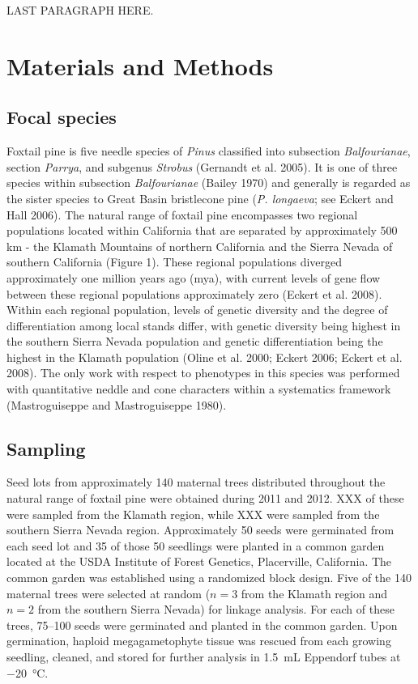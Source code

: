 \documentclass[11pt]{article}
\begin{document}
LAST PARAGRAPH HERE.


\section{Materials and Methods}

\subsection{Focal species}
Foxtail pine is five needle species of \textit{Pinus} classified into 
subsection \textit{Balfourianae}, section \textit{Parrya}, and subgenus \textit{Strobus} 
(Gernandt et al. 2005). It is one of three species within subsection \textit{Balfourianae} 
(Bailey 1970) and generally is regarded as the sister species to Great Basin bristlecone pine (\textit{P. longaeva}; see 
Eckert and Hall 2006). The natural range of foxtail pine encompasses two 
regional populations located within California that are separated by approximately 500 km - 
the Klamath Mountains of northern California and the Sierra Nevada of southern California 
(Figure 1). These regional populations diverged approximately one million years ago (mya), 
with current levels of gene flow between these regional populations approximately zero 
(Eckert et al. 2008). Within each regional population, levels of genetic diversity and the 
degree of differentiation among local stands differ, with genetic diversity being highest in 
the southern Sierra Nevada population and genetic differentiation being the highest in the 
Klamath population (Oline et al. 2000; Eckert 2006; Eckert et al. 2008). The only work with
respect to phenotypes in this species was performed with quantitative neddle and cone characters 
within a systematics framework (Mastroguiseppe and Mastroguiseppe 1980).

\subsection{Sampling}
Seed lots from approximately 140 maternal trees distributed throughout the natural range 
of foxtail pine were obtained during 2011 and 2012. XXX of these were sampled from the 
Klamath region, while XXX were sampled from the southern Sierra Nevada region. Approximately 
50 seeds were germinated from each seed lot and 35 of those 50 seedlings were planted in a 
common garden located at the USDA Institute of Forest Genetics, Placerville, California. The 
common garden was established using a randomized block design.
Five of the 140 maternal trees were selected at random ($n = 3$ from the Klamath region and $n = 2$ from 
the southern Sierra Nevada) for linkage analysis. For each of these trees, \SIrange{75}{100}{} 
seeds were germinated and planted in the common garden. Upon germination, haploid 
megagametophyte tissue was rescued from each growing seedling, cleaned, and stored for further 
analysis in \SI{1.5}{\mL} Eppendorf tubes at \SI{-20}{\celsius}.
\end{document}
